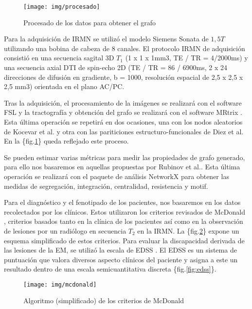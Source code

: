 \documentclass[fleqn,12pt]{uicarticle} %
\begin{document}
\begin{figure}[h]
	\centering
	\texttt{[image: img/procesado]}
	\vspace{5mm} 
	\caption{Procesado de los datos para obtener el grafo}
	\label{fig:pipeline}
\end{figure}


Para la adquisición de IRMN se utilizó el modelo Siemens Sonata de $1,5T$ utilizando una bobina de cabeza de $8$ canales. El protocolo IRMN de adquisición consistió en una secuencia sagital 3D $T_1$ (1 x 1 x 1mm3, TE / TR = 4/2000ms) y una secuencia axial DTI de spin-echo 2D (TE / TR = 86 / 6900ms, 2 x 24 direcciones de difusión en gradiente, b = 1000, resolución espacial de 2,5 x 2,5 x 2,5 mm3) orientada en el plano AC/PC.

Tras la adquisición, el procesamiento de la imágenes se realizará con el software FSL \cite{Jenkinson2012} y la tractografía y obtención del grafo se realizará con el software MRtrix \cite{Tournier2012}. Esta última operación se repetirá en dos ocasiones, una con los nodos aleatorios de Kocevar et al. y otra con las pariticiones estructuro-funcionales de Diez et al. En la \{fig.\ref{fig:pipeline}\} queda reflejado este proceso.

Se pueden estimar varias métricas para medir las propiedades de grafo generado, para ello nos basaremos en aquellas propuestas por Rubinov et al.\cite{Rubinov2010}. Esta última operación se realizará con el paquete de análisis NetworkX \cite{Daducci2012} para obtener las medidas de segregación, integración, centralidad, resistencia y motif.


Para el diagnóstico y el fenotipado de los pacientes, nos basaremos en los datos recolectados por los clínicos. Estos utilizaron los criterios revisados de McDonald \cite{Mcdonald2001, Polman2011}, criterios basados tanto en la clínica de los pacientes así como en la observación de lesiones por un radiólogo en secuencia $T_2$ en la IRMN. La \{fig.\ref{fig:mcdonald}\} expone un esquema simplificado de estos criterios.  Para evaluar la discapacidad derivada de las lesiones de la EM, se utilizó la escala de EDSS \cite{Kurtzke1983}. El EDSS es un sistema de puntuación que valora diversos aspecto clínicos del paciente y asigna a este un resultado dentro de una escala semicuantitativa discreta \{fig.\ref{fig:edss}\}.

\begin{figure}[b]
	\centering
	\texttt{[image: img/mcdonald]}
	\vspace{5mm} 
	\caption{Algoritmo (simplificado) de los criterios de McDonald}
	\label{fig:mcdonald}
\end{figure}
\end{document}
